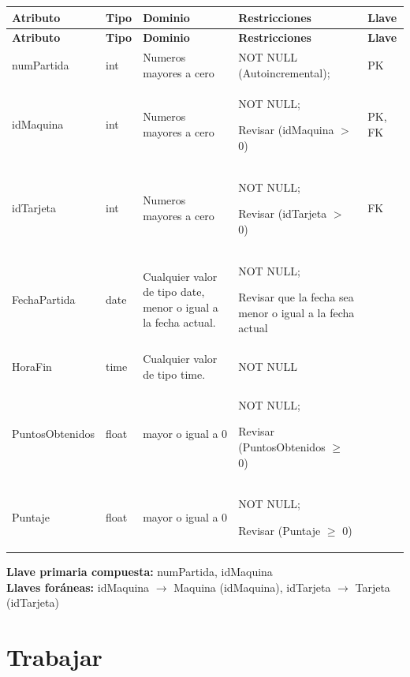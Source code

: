 \documentclass[12pt]{article}
\begin{document}
\begin{longtable}{p{3.2cm} p{2.2cm} p{4.8cm} p{4.2cm} p{1.2cm}}
\label{tab:partida}\\
\toprule
\textbf{Atributo} & \textbf{Tipo} & \textbf{Dominio} & \textbf{Restricciones} & \textbf{Llave} \\
\midrule
\endfirsthead

\toprule
\textbf{Atributo} & \textbf{Tipo} & \textbf{Dominio} & \textbf{Restricciones} & \textbf{Llave} \\
\midrule
\endhead

\bottomrule
\endfoot

numPartida 
& int 
& Numeros mayores a cero
& NOT NULL (Autoincremental);
& PK \\

idMaquina 
& int 
& Numeros mayores a cero
& NOT NULL;

Revisar (idMaquina $>$ 0)
& PK, FK \\

idTarjeta 
& int 
& Numeros mayores a cero
& NOT NULL;

Revisar (idTarjeta $>$ 0)
& FK \\

FechaPartida 
& date 
& Cualquier valor de tipo date, menor o igual a la fecha actual.
& NOT NULL;

Revisar que la fecha sea menor o igual a la fecha actual
& \\

HoraFin 
& time
& Cualquier valor de tipo time.
& NOT NULL 
& \\

PuntosObtenidos 
& float 
& mayor o igual a 0 
& NOT NULL; 

Revisar (PuntosObtenidos $\geq$ 0) 
& \\

Puntaje 
& float 
& mayor o igual a 0 
& NOT NULL;

Revisar (Puntaje $\geq$ 0)
& \\

\end{longtable}

\vspace{2pt}
\textbf{Llave primaria compuesta:} numPartida, idMaquina\\
\textbf{Llaves foráneas:} idMaquina $\rightarrow$ Maquina (idMaquina), idTarjeta $\rightarrow$ Tarjeta (idTarjeta)\\


\section*{Trabajar}
\end{document}
